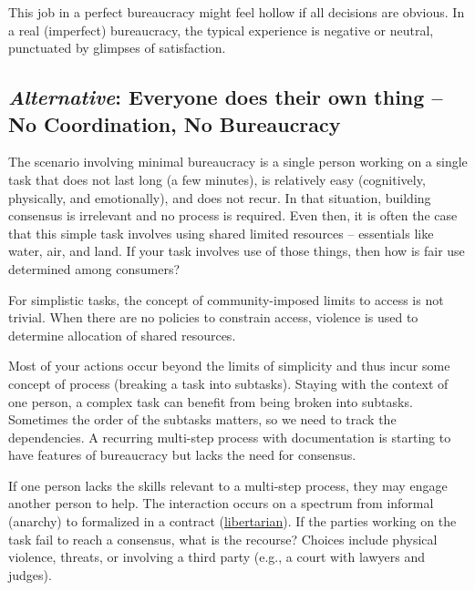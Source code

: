 This job in a perfect bureaucracy might feel hollow if all decisions are obvious. In a real (imperfect) bureaucracy, the typical experience is negative or neutral, punctuated by glimpses of satisfaction. 

\subsection*{\textit{Alternative}: Everyone does their own thing -- No Coordination, No Bureaucracy}
The scenario involving minimal bureaucracy is a single person working on a single task that does not last long (a few minutes), is relatively easy (cognitively, physically, and emotionally), and does not recur. In that situation, building consensus is irrelevant and no process is required. Even then, it is often the case that this simple task involves using shared limited resources --  essentials like water, air, and land. If your task involves use of those things, then how is fair use determined among consumers?

For simplistic tasks, the concept of community-imposed limits to access 
\iftoggle{glossarysubstitutionworks}{\glspl{shared resource}}{shared resources}
is not trivial. When there are no policies to constrain access, violence is used to determine allocation of shared resources.

Most of your actions occur beyond the limits of simplicity and thus incur some concept of \gls{process}
\iftoggle{glossaryinmargin}{\marginpar{[Glossary]}}{}%
(breaking a task into subtasks). Staying with the context of one person, a complex task can benefit from being broken into subtasks. Sometimes the order of the subtasks matters, so we need to track the dependencies. A recurring multi-step process with documentation is starting to have features of bureaucracy but lacks the need for consensus. 


If one person lacks the skills relevant to a multi-step process, they may engage another person to help. The interaction occurs on a spectrum from informal (anarchy) to formalized in a contract (\href{https://en.wikipedia.org/wiki/Libertarianism}{libertarian}).
\iftoggle{WPinmargin}{\marginpar{$>$Wikipedia: libertarian}}{}%
If the parties working on the task fail to reach a consensus, what is the recourse? Choices include physical violence, threats, or involving a third party (e.g., a court with lawyers and judges). 


